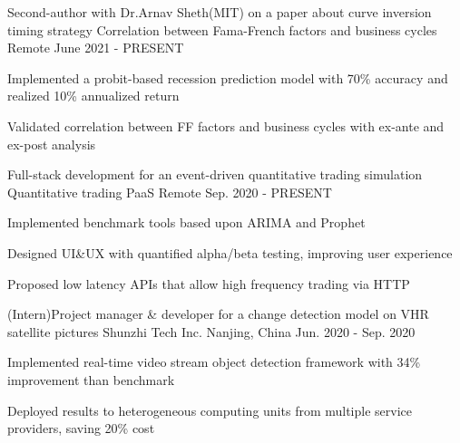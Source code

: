\begin{cventries}
  \cventry
    {Second-author with Dr.Arnav Sheth(MIT) on a paper about curve inversion timing strategy}
    {Correlation between Fama-French factors and business cycles}
    {Remote}
    {June 2021 - PRESENT}
    {
      \begin{cvitems}
        \item {Implemented a probit-based recession prediction model with 70\% accuracy and realized 10\% annualized return}
        \item {Validated correlation between FF factors and business cycles with ex-ante and ex-post analysis}
      \end{cvitems}
    }

  \cventry
    {Full-stack development for an event-driven quantitative trading simulation}
    {Quantitative trading PaaS}
    {Remote}
    {Sep. 2020 - PRESENT}
    {
      \begin{cvitems}
        \item {Implemented benchmark tools based upon ARIMA and Prophet}
        \item {Designed UI\&UX with quantified alpha/beta testing, improving user experience}
        \item {Proposed low latency APIs that allow high frequency trading via HTTP}
      \end{cvitems}
    }

  \cventry
    {(Intern)Project manager \& developer for a change detection model on VHR satellite pictures}
    {Shunzhi Tech Inc.}
    {Nanjing, China}
    {Jun. 2020 - Sep. 2020}
    {
      \begin{cvitems}
        \item {Implemented real-time video stream object detection framework with 34\% improvement than benchmark}
        \item {Deployed results to heterogeneous computing units from multiple service providers, saving 20\% cost}
      \end{cvitems}
    }


\end{cventries}
